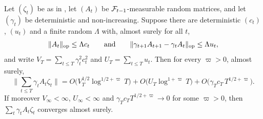 \begin{lemma}
\label{lem:series}
Let $(\zeta_t)$ be as in , let $(A_t)$ be $\mathcal{F}_{t-1}$-measurable random
matrices, and let $(\gamma_t)$ be deterministic and non-increasing. Suppose there are
deterministic $(c_t)$, $(u_t)$ and a finite random $\Lambda$ with, almost surely for all $t$,
\begin{equation}
\lVert A_t \rVert_{\mathrm{op}}\le\Lambda c_t
\qquad\text{and}\qquad
\lVert \gamma_{t+1}A_{t+1}-\gamma_tA_t \rVert_{\mathrm{op}}\le\Lambda u_t ,
\label{eq:weightcond}
\end{equation}
and write $V_T=\sum_{t\le T}\gamma_t^2c_t^2$ and $U_T=\sum_{t\le T}u_t$. Then for every
$\varpi>0$, almost surely,
\begin{equation}
\Big\lVert\sum_{t\le T}\gamma_tA_t\zeta_t\Big\rVert
=O\big(V_T^{1/2}\log^{1/2+\varpi}T\big)
+O\big(U_T\log^{1+\varpi}T\big)
+O\big(\gamma_Tc_T\,T^{1/2+\varpi}\big).
\label{eq:lemrate}
\end{equation}
If moreover $V_\infty<\infty$, $U_\infty<\infty$ and $\gamma_Tc_TT^{1/2+\varpi}\to0$ for some
$\varpi>0$, then $\sum_t\gamma_tA_t\zeta_t$ converges almost surely.
\end{lemma}

